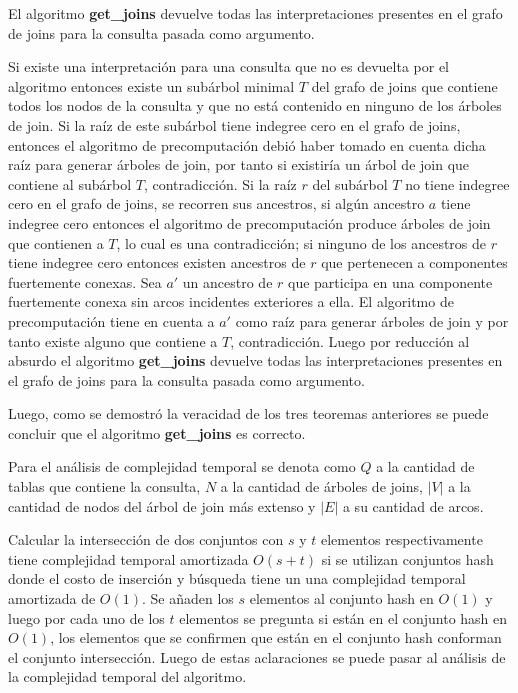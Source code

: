 \begin{theorem}
    El algoritmo \textbf{get\_joins} devuelve todas las interpretaciones presentes en el grafo de joins 
    para la consulta pasada como argumento.
\end{theorem}

Si existe una interpretaci\'on para una consulta que no es devuelta por el algoritmo entonces 
existe un sub\'arbol minimal $T$ del grafo de joins que contiene todos los nodos de la consulta y que no est\'a contenido 
en ninguno de los \'arboles de join. Si la raíz de este sub\'arbol tiene indegree cero en el grafo de joins, entonces 
el algoritmo de precomputaci\'on debi\'o haber tomado en cuenta dicha ra\'iz para generar \'arboles de join, 
por tanto si existir\'ia un \'arbol de join que contiene al sub\'arbol $T$, contradicción. Si la ra\'iz $r$ del 
sub\'arbol $T$ no tiene indegree cero en el grafo de joins, se recorren sus ancestros, si algún ancestro $a$ tiene 
indegree cero entonces el algoritmo de precomputaci\'on produce \'arboles de join que contienen a $T$, lo 
cual es una contradicción; si ninguno de los ancestros de $r$ tiene indegree cero entonces existen 
ancestros de $r$ que pertenecen a componentes fuertemente conexas. Sea $a'$ un ancestro de $r$ que 
participa en una componente fuertemente conexa sin arcos incidentes exteriores a ella. El algoritmo 
de precomputaci\'on tiene en cuenta a $a'$ como ra\'iz para generar \'arboles de join y por tanto 
existe alguno que contiene a $T$, contradicción. Luego por reducci\'on al absurdo el algoritmo 
\textbf{get\_joins} devuelve todas las interpretaciones presentes en el grafo de joins 
para la consulta pasada como argumento.

Luego, como se demostr\'o la veracidad de los tres teoremas anteriores se puede concluir que el 
algoritmo \textbf{get\_joins} es correcto.

Para el análisis de complejidad temporal se denota como $Q$ a la cantidad de tablas que contiene la consulta, 
$N$ a la cantidad de \'arboles de joins, $|V|$ a la cantidad de nodos del \'arbol de join m\'as extenso y $|E|$
a su cantidad de arcos. 

Calcular la intersección de dos conjuntos con $s$ y $t$ elementos respectivamente tiene 
complejidad temporal amortizada $O(s + t)$ si se utilizan conjuntos hash donde el costo de inserción y b\'usqueda 
tiene un una complejidad temporal amortizada de $O(1)$. Se añaden los $s$ elementos al conjunto hash en $O(1)$
y luego por cada uno de los $t$ elementos se pregunta si est\'an en el conjunto hash en $O(1)$, los elementos 
que se confirmen que est\'an en el conjunto hash conforman el conjunto intersección. Luego de estas aclaraciones 
se puede pasar al análisis de la complejidad temporal del algoritmo.

